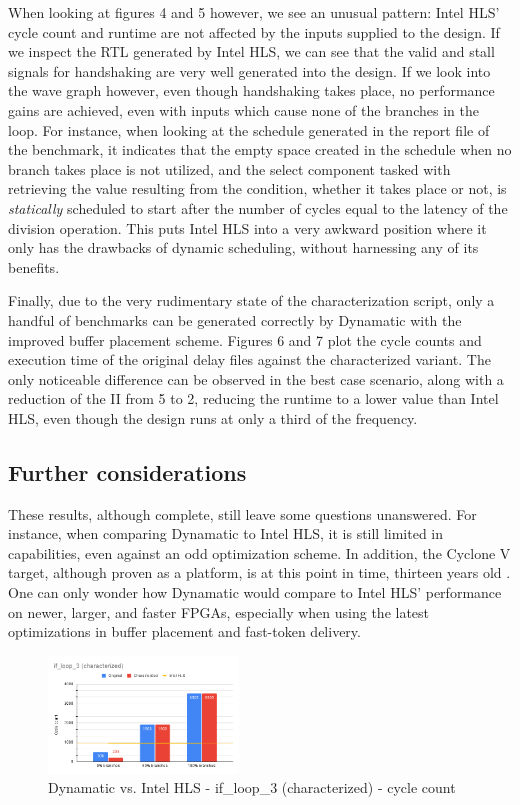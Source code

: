 \documentclass[final,5p,times,twocolumn]{elsarticle}
\begin{document}
\begin{spacing}{1.125}
When looking at figures 4 and 5 however, we see an unusual pattern: Intel HLS' cycle count and runtime are not affected by the inputs supplied to the design. If we inspect the RTL generated by Intel HLS, we can see that the valid and stall signals for handshaking are very well generated into the design. If we look into the wave graph however, even though handshaking takes place, no performance gains are achieved, even with inputs which cause none of the branches in the loop. For instance, when looking at the schedule generated in the report file of the benchmark, it indicates that the empty space created in the schedule when no branch takes place is not utilized, and the select component tasked with retrieving the value resulting from the condition, whether it takes place or not, is \textit{statically} scheduled to start after the number of cycles equal to the latency of the division operation. This puts Intel HLS into a very awkward position where it only has the drawbacks of dynamic scheduling, without harnessing any of its benefits.

Finally, due to the very rudimentary state of the characterization script, only a handful of benchmarks can be generated correctly by Dynamatic with the improved buffer placement scheme. Figures 6 and 7 plot the cycle counts and execution time of the original delay files against the characterized variant. The only noticeable difference can be observed in the best case scenario, along with a reduction of the II from 5 to 2, reducing the runtime to a lower value than Intel HLS, even though the design runs at only a third of the frequency.

\subsection{Further considerations}

These results, although complete, still leave some questions unanswered. For instance, when comparing Dynamatic to Intel HLS, it is still limited in capabilities, even against an odd optimization scheme. In addition, the Cyclone V target, although proven as a platform, is at this point in time, thirteen years old \cite{cyc_v}. One can only wonder how Dynamatic would compare to Intel HLS' performance on newer, larger, and faster FPGAs, especially when using the latest optimizations in buffer placement and fast-token delivery.

\begin{figure}
	\centering 
	\includegraphics[width=0.45\textwidth]{dyn_char_cycles.png}	
	\caption{Dynamatic vs. Intel HLS - if\_loop\_3 (characterized) - cycle count} 
	\label{fig_mom0}%
\end{figure}


\end{spacing}
\end{document}
